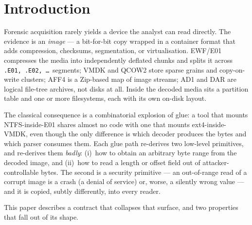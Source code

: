 \documentclass[10pt,twocolumn]{article}
\begin{document}
\section{Introduction}\label{sec:intro}

Forensic acquisition rarely yields a device the analyst can read directly. The
evidence is an \emph{image} --- a bit-for-bit copy wrapped in a container format
that adds compression, checksums, segmentation, or virtualisation. EWF/E01
\citep{libewf} compresses the media into independently deflated chunks and splits
it across \texttt{.E01, .E02, \dots}\ segments; VMDK and QCOW2 store sparse
grains and copy-on-write clusters; AFF4 \citep{aff4} is a Zip-based map of image
streams; AD1 and DAR are logical file-tree archives, not disks at all. Inside the
decoded media sits a partition table and one or more filesystems, each with its
own on-disk layout.

The classical consequence is a combinatorial explosion of glue: a tool that
mounts NTFS-inside-E01 shares almost no code with one that mounts ext4-inside-VMDK,
even though the only difference is which decoder produces the bytes and which
parser consumes them. Each glue path re-derives two low-level primitives, and
re-derives them \emph{badly}: (i)~how to obtain an arbitrary byte range from the
decoded image, and (ii)~how to read a length or offset field out of
attacker-controllable bytes. The second is a security primitive --- an
out-of-range read of a corrupt image is a crash (a denial of service) or, worse,
a silently wrong value --- and it is copied, subtly differently, into every
reader.

This paper describes a contract that collapses that surface, and two properties
that fall out of its shape.
\end{document}
